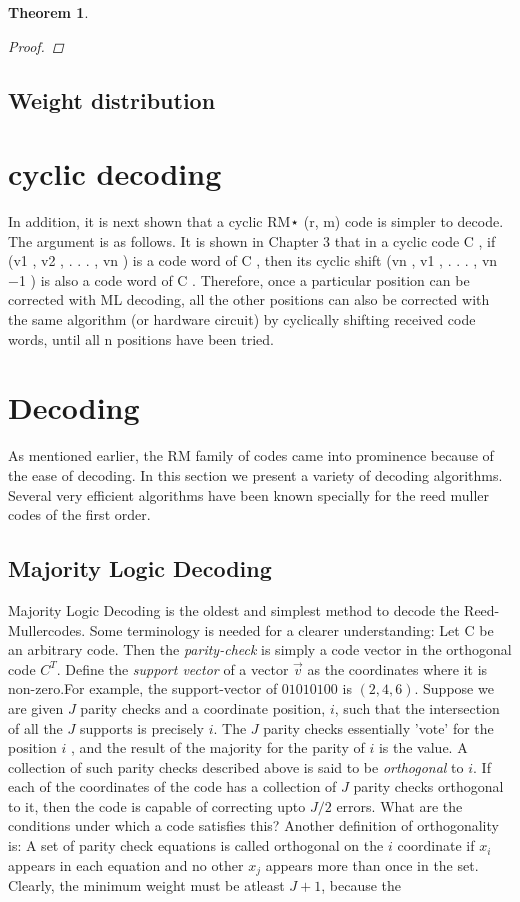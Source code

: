 \documentclass{article}
\newcommand{\rem}{Reed-Muller}
\newtheorem{thm}{Theorem}
\begin{document}
\begin{thm}

\begin{proof}
\end{proof}
\end{thm}

\subsection {Weight distribution}

\section{cyclic decoding}
In addition, it is next shown that a cyclic RM⋆ (r, m) code is simpler to decode. The 
argument is as follows. It is shown in Chapter 3 that in a cyclic code C , if (v1 , v2 , . . . , vn ) 
is a code word of C , then its cyclic shift (vn , v1 , . . . , vn 
−1 ) is also a code word of C . 
Therefore, once a particular position can be corrected with ML decoding, all the other 
positions can also be corrected with the same algorithm (or hardware circuit) by cyclically 
shifting received code words, until all n positions have been tried.
\section {Decoding}
As mentioned earlier, the RM family of codes came into prominence because of the ease of decoding. In this section we present a variety of decoding algorithms. 
Several very efficient algorithms have been known specially for the reed muller codes of the first order. 
\subsection {Majority Logic Decoding}
Majority Logic Decoding is the oldest and simplest method to decode the \rem codes. 
Some terminology is needed for a clearer understanding:
Let C be an arbitrary code. Then the \emph{parity-check} is simply a code vector in the orthogonal code $C^{T}$. 
Define the \emph{support vector} of a vector $\vec{v}$ as the coordinates where it is non-zero.For example, the support-vector of $01010100$ is $(2,4,6)$.
Suppose we are given $J$ parity checks and a coordinate position, $i$, such that the intersection of all the $J$ supports is precisely $i$. The $J$ parity checks essentially 'vote' for the position $i$ , and the result of the majority for the parity of $i$ is the value. 
A collection of such parity checks described above is said to be \emph{orthogonal} to $i$. If each of the coordinates of the code has a collection of $J$ parity checks orthogonal to it, then the code is capable of correcting upto $J/2$  errors.
What are the conditions under which a code satisfies this?
Another definition of orthogonality is: A set of parity check equations is called orthogonal on the $i$ coordinate if $x_i$ appears in each equation and no other $x_j$ appears more than once in the set.
Clearly, the minimum weight must be atleast $J+1$, because the 
\end{document}
